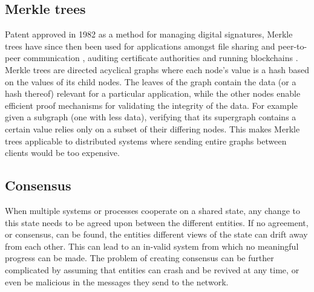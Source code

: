 \documentclass[english, biblatex, digitaloutput]{kththesis}
\begin{document}
\subsection{Merkle trees}

Patent approved in 1982 \cite{merkle_method_1982} as a method for managing digital signatures, Merkle trees have since then been used for applications amongst file sharing and peer-to-peer communication \cite{daniel_ipfs_2022}, auditing certificate authorities \cite{laurie_certificate_2013} and running blockchains \cite{zahed_benisi_blockchain-based_2020}. Merkle trees are directed acyclical graphs where each node's value is a hash based on the values of its child nodes. The leaves of the graph contain the data (or a hash thereof) relevant for a particular application, while the other nodes enable efficient proof mechanisms for validating the integrity of the data. For example given a subgraph (\ie one with less data), verifying that its supergraph contains a certain value relies only on a subset of their differing nodes. This makes Merkle trees applicable to distributed systems where sending entire graphs between clients would be too expensive.

\subsection{Consensus}

When multiple systems or processes cooperate on a shared state, any change to this state needs to be agreed upon between the different entities. If no agreement, or consensus, can be found, the entities different views of the state can drift away from each other. This can lead to an in-valid system from which no meaningful progress can be made. The problem of creating consensus can be further complicated by assuming that entities can crash and be revived at any time, or even be malicious in the messages they send to the network.
\end{document}
